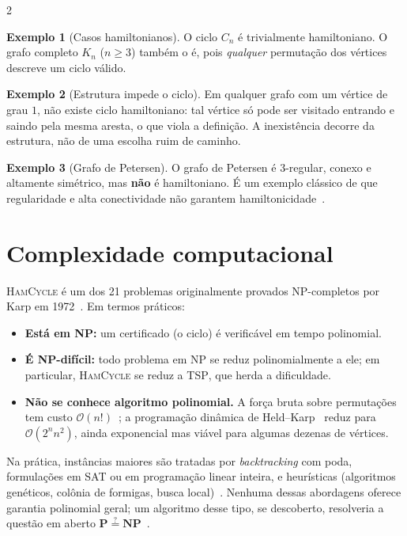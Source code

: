 \documentclass[10pt,a4paper]{article}
\theoremstyle{definition}
\newtheorem{exm}{Exemplo}
\begin{document}
\begin{multicols}{2}
\begin{exm}[Casos hamiltonianos]
O ciclo $C_n$ é trivialmente hamiltoniano. O grafo completo $K_n$ ($n \geq 3$) também o é, pois \emph{qualquer} permutação dos vértices descreve um ciclo válido.
\end{exm}

\begin{exm}[Estrutura impede o ciclo]
Em qualquer grafo com um vértice de grau $1$, não existe ciclo hamiltoniano: tal vértice só pode ser visitado entrando e saindo pela mesma aresta, o que viola a definição. A inexistência decorre da estrutura, não de uma escolha ruim de caminho.
\end{exm}

\begin{exm}[Grafo de Petersen]
O grafo de Petersen é 3-regular, conexo e altamente simétrico, mas \textbf{não} é hamiltoniano. É um exemplo clássico de que regularidade e alta conectividade não garantem hamiltonicidade~\citep{bondy2008}.
\end{exm}

\section{Complexidade computacional}

\textsc{HamCycle} é um dos 21 problemas originalmente provados NP-completos por Karp em 1972~\citep{karp1972}. Em termos práticos:

\begin{itemize}[leftmargin=*, itemsep=1pt]
  \item \textbf{Está em NP:} um certificado (o ciclo) é verificável em tempo polinomial.
  \item \textbf{É NP-difícil:} todo problema em NP se reduz polinomialmente a ele; em particular, \textsc{HamCycle} se reduz a \textsc{TSP}, que herda a dificuldade.
  \item \textbf{Não se conhece algoritmo polinomial.} A força bruta sobre permutações tem custo $\mathcal{O}(n!)$~\citep{knuth2011}; a programação dinâmica de Held--Karp~\citep{heldkarp1962} reduz para $\mathcal{O}(2^n n^2)$, ainda exponencial mas viável para algumas dezenas de vértices.
\end{itemize}

Na prática, instâncias maiores são tratadas por \emph{backtracking} com poda, formulações em SAT ou em programação linear inteira, e heurísticas (algoritmos genéticos, colônia de formigas, busca local)~\citep{cormen2012,dasgupta2009}. Nenhuma dessas abordagens oferece garantia polinomial geral; um algoritmo desse tipo, se descoberto, resolveria a questão em aberto $\mathbf{P} \stackrel{?}{=} \mathbf{NP}$~\citep{sipser2005}.


\end{multicols}
\end{document}
